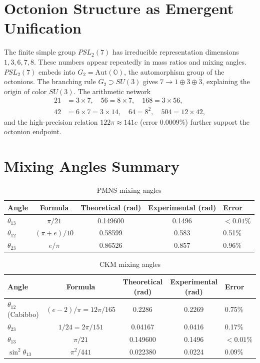 ﻿\documentclass[11pt,a4paper]{article}
\theoremstyle{definition}
\begin{document}
\section{Octonion Structure as Emergent Unification}

The finite simple group $PSL_2(7)$ has irreducible representation dimensions $1,3,6,7,8$. These numbers appear repeatedly in mass ratios and mixing angles. $PSL_2(7)$ embeds into $G_2 = \text{Aut}(\mathbb{O})$, the automorphism group of the octonions. The branching rule $G_2 \supset SU(3)$ gives $7 \rightarrow 1 \oplus 3 \oplus \bar{3}$, explaining the origin of color $SU(3)$. The arithmetic network
\begin{align}
21 &= 3\times7,\quad 56 = 8\times7,\quad 168 = 3\times56,\\
42 &= 6\times7 = 3\times14,\quad 64 = 8^2,\quad 504 = 12\times42,
\end{align}
and the high-precision relation $122\pi \approx 141e$ (error $0.0009\%$) further support the octonion endpoint.

\section{Mixing Angles Summary}

\begin{table}[h]
\centering
\caption{PMNS mixing angles}
\begin{tabular}{lcccl}
\toprule
\textbf{Angle} & \textbf{Formula} & \textbf{Theoretical (rad)} & \textbf{Experimental (rad)} & \textbf{Error} \\
\midrule
$\theta_{13}$ & $\pi/21$ & 0.149600 & 0.1496 & $<0.01\%$ \\
$\theta_{12}$ & $(\pi+e)/10$ & 0.58599 & 0.583 & 0.51\% \\
$\theta_{23}$ & $e/\pi$ & 0.86526 & 0.857 & 0.96\% \\
\bottomrule
\end{tabular}
\end{table}

\begin{table}[h]
\centering
\caption{CKM mixing angles}
\begin{tabular}{lcccl}
\toprule
\textbf{Angle} & \textbf{Formula} & \textbf{Theoretical (rad)} & \textbf{Experimental (rad)} & \textbf{Error} \\
\midrule
$\theta_{12}$ (Cabibbo) & $(e-2)/\pi = 12\pi/165$ & 0.2286 & 0.2269 & 0.75\% \\
$\theta_{23}$ & $1/24 = 2\pi/151$ & 0.04167 & 0.0416 & 0.17\% \\
$\theta_{13}$ & $\pi/21$ & 0.149600 & 0.1496 & $<0.01\%$ \\
$\sin^2\theta_{13}$ & $\pi^2/441$ & 0.022380 & 0.0224 & 0.09\% \\
\bottomrule
\end{tabular}
\end{table}
\end{document}
